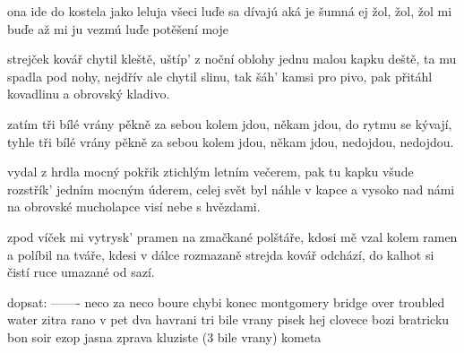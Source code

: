 ona ide do kostela jako leluja
všeci luďe sa dívajú aká je šumná
ej žol, žol, žol mi buďe až mi ju vezmú luďe
potěšení moje



strejček kovář chytil kleště, uštíp' z noční oblohy
jednu malou kapku deště, ta mu spadla pod nohy,
nejdřív ale chytil slinu, tak šáh' kamsi pro pivo,
pak přitáhl kovadlinu a obrovský kladivo.

zatím tři bílé vrány pěkně za sebou
kolem jdou, někam jdou, do rytmu se kývají,
tyhle tři bílé vrány pěkně za sebou
kolem jdou, někam jdou, nedojdou, nedojdou.

vydal z hrdla mocný pokřik ztichlým letním večerem,
pak tu kapku všude rozstřík' jedním mocným úderem,
celej svět byl náhle v kapce a vysoko nad námi
na obrovské mucholapce visí nebe s hvězdami.

zpod víček mi vytrysk' pramen na zmačkané polštáře,
kdosi mě vzal kolem ramen a políbil na tváře,
kdesi v dálce rozmazaně strejda kovář odchází,
do kalhot si čistí ruce umazané od sazí.



\bye

dopsat:
-------
neco za neco
boure
chybi konec montgomery
bridge over troubled water
zitra rano v pet
dva havrani
tri bile vrany
pisek
hej clovece bozi
bratricku
bon soir
ezop
jasna zprava
kluziste (3 bile vrany)
kometa
